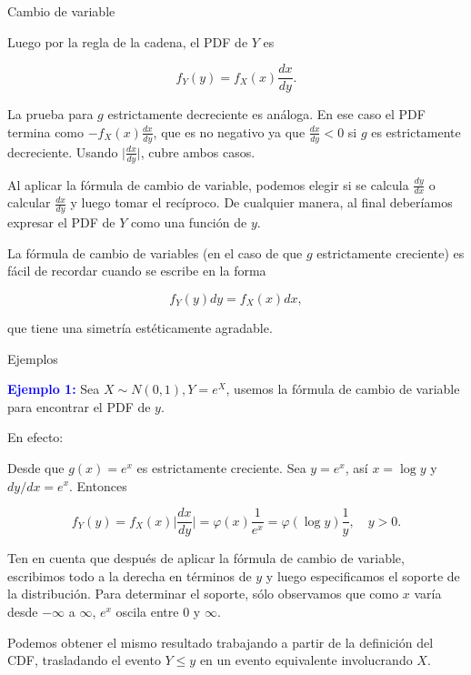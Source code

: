 \documentclass[10pt]{beamer}
\begin{document}
\begin{frame}{Cambio de variable}
\small{Luego  por la regla de la cadena, el PDF de $Y$ es
	
	\[
	f_Y(y) = f_X(x)\frac{dx}{dy}.
	\]

La prueba para $g$ estrictamente decreciente es an\'aloga. En ese caso el PDF termina como  $-f_X(x)\frac{dx}{dy}$, que es no negativo ya que $\frac{dx}{dy} <0$ si $g$ es estrictamente decreciente. Usando $\vert \frac{dx}{dy}\vert$, cubre ambos casos.


Al aplicar la f\'ormula de cambio de variable, podemos elegir si se calcula $\frac{dy}{dx}$ o calcular $\frac{dx}{dy}$ y luego tomar el rec\'iproco. De cualquier manera, al final deber\'iamos expresar el PDF de $Y$ como una funci\'on de $y$. 

La f\'ormula de cambio de variables (en el caso de que $g$ estrictamente creciente) es f\'acil de recordar cuando se escribe en la forma

\[
f_Y(y)dy = f_X(x)dx,
\]

que tiene una simetr\'ia est\'eticamente agradable.
}
\end{frame}

\begin{frame}{Ejemplos}
\small{ \textcolor{blue}{\textbf{Ejemplo 1:}} Sea $X \sim N(0,1), Y = e^X$, usemos la f\'ormula de cambio de variable para encontrar el PDF  de $y$.
	
En efecto:

Desde que $g(x)  = e^x$ es estrictamente creciente. Sea $y = e^x$, as\'i $x = \log y$ y $dy/dx = e^x$. Entonces

\[
f_Y(y) = f_X(x)\biggl\vert  \frac{dx}{dy}\biggr\vert  =\varphi(x)\frac{1}{e^x} = \varphi(\log y)\frac{1}{y}, \quad y >0.
\]

\vspace{0.2cm}


Ten en cuenta que despu\'es de aplicar la f\'ormula de cambio de variable, escribimos todo a la derecha en t\'erminos de $y$ y luego  especificamos el soporte de la distribuci\'on. Para determinar el soporte, s\'olo observamos que como $x$ var\'ia desde $-\infty$ a $\infty$,  $e^x$ oscila entre $0$ y $\infty$.

Podemos obtener el mismo resultado trabajando a partir de la definici\'on del CDF, trasladando el evento $Y \leq y$  en un evento equivalente involucrando $X$.
}
\end{frame}
\end{document}
